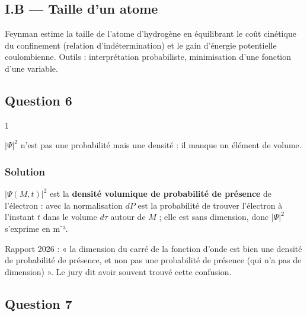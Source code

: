 \documentclass[11pt,a4paper]{article}
\newcommand{\equationajustee}[1]{%
  \sbox{\boiteequation}{$\displaystyle #1$}%
  \ifdim\wd\boiteequation>\linewidth
    \[\resizebox{\linewidth}{!}{\usebox{\boiteequation}}\]%
  \else
    \[#1\]%
  \fi}
\begin{document}
\hypertarget{i.b-taille-dun-atome}{%
\subsection{I.B --- Taille d'un atome}\label{i.b-taille-dun-atome}}

Feynman estime la taille de l'atome d'hydrogène en équilibrant le coût cinétique du confinement (relation d'indétermination) et le gain d'énergie potentielle coulombienne. Outils : interprétation probabiliste, minimisation d'une fonction d'une variable.

\hypertarget{question-6}{%
\subsection{Question 6}\label{question-6}}

\begin{indication}{1}

\(|\Psi|^2\) n'est pas une probabilité mais une densité : il manque un élément de volume.

\end{indication}

\hypertarget{solution-5}{%
\subsubsection{Solution}\label{solution-5}}

\(|\Psi(M,t)|^2\) est la \textbf{densité volumique de probabilité de présence} de l'électron :
\equationajustee{\boxed{dP=|\Psi(M,t)|^2\,d\tau}}
avec la normalisation
\equationajustee{\iiint_{\mathrm{espace}}|\Psi|^2d\tau=1.}
\(dP\) est la probabilité de trouver l'électron à l'instant \(t\) dans le volume \(d\tau\) autour de \(M\) ; elle est sans dimension, donc \(|\Psi|^2\) s'exprime en m⁻³.

\begin{jury}

Rapport 2026 : « la dimension du carré de la fonction d'onde est bien une densité de probabilité de présence, et non pas une probabilité de présence (qui n'a pas de dimension) ». Le jury dit avoir souvent trouvé cette confusion.

\end{jury}

\hypertarget{question-7}{%
\subsection{Question 7}\label{question-7}}
\end{document}
